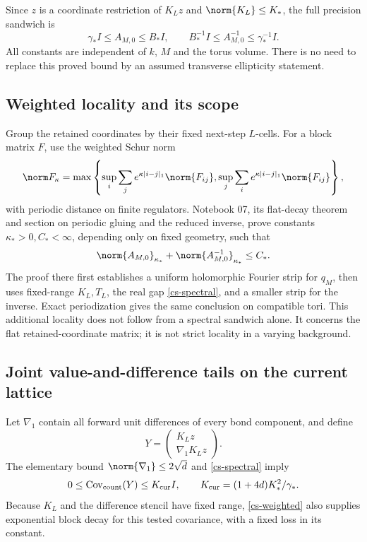 Since $z$ is a coordinate restriction of $K_Lz$ and
$\norm{K_L}\le K_*$, the full precision sandwich is
\begin{equation}\label{cs-spectral}
 \gamma_*I\le A_{M,0}\le B_*I,
 \qquad
 B_*^{-1}I\le A_{M,0}^{-1}\le\gamma_*^{-1}I.
\end{equation}
All constants are independent of $k$, $M$ and the torus volume.
There is no need to replace this proved bound by an assumed
transverse ellipticity statement.

\subsection{Weighted locality and its scope}

Group the retained coordinates by their fixed next-step $L$-cells.
For a block matrix $F$, use the weighted Schur norm
\[
 \norm F_\kappa=
 \max\left\{
 \sup_i\sum_j e^{\kappa|i-j|_1}\norm{F_{ij}},
 \sup_j\sum_i e^{\kappa|i-j|_1}\norm{F_{ij}}
 \right\},
\]
with periodic distance on finite regulators. Notebook 07,
its flat-decay theorem and section on periodic gluing and the reduced inverse,
prove constants $\kappa_*>0,C_*<\infty$, depending only on fixed
geometry, such that
\begin{equation}\label{cs-weighted}
 \norm{A_{M,0}}_{\kappa_*}
 +\norm{A_{M,0}^{-1}}_{\kappa_*}\le C_*.
\end{equation}
The proof there first establishes a uniform holomorphic Fourier
strip for $q_M$, then uses fixed-range $K_L,T_L$, the real gap
\eqref{cs-spectral}, and a smaller strip for the inverse.
Exact periodization gives the same conclusion on compatible tori.
This additional locality does not follow from a spectral sandwich
alone. It concerns the flat retained-coordinate matrix; it is not
strict locality in a varying background.

\subsection{Joint value-and-difference tails on the current lattice}

Let $\nabla_1$ contain all forward unit differences of every bond
component, and define
\begin{equation}\label{cs-tested-field}
 Y=\begin{pmatrix}K_Lz\\\nabla_1K_Lz\end{pmatrix}.
\end{equation}
The elementary bound
$\norm{\nabla_1}\le2\sqrt d$ and
\eqref{cs-spectral} imply
\begin{equation}\label{cs-tested-covariance}
 0\le\operatorname{Cov}_{\rm count}(Y)\le
 K_{\rm cur}I,
 \qquad K_{\rm cur}=(1+4d)K_*^2/\gamma_*.
\end{equation}
Because $K_L$ and the difference stencil have fixed range,
\eqref{cs-weighted} also supplies exponential block decay for this
tested covariance, with a fixed loss in its constant.

